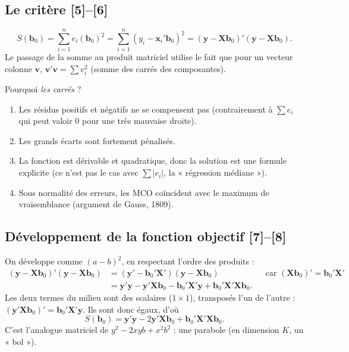 \documentclass[11pt,a4paper]{article}
\newcommand{\vy}{\mathbf{y}}
\newcommand{\vX}{\mathbf{X}}
\newcommand{\vb}{\mathbf{b}}
\newcommand{\vx}{\mathbf{x}}
\newcommand{\XtX}{\vX'\vX}
\newcommand{\sumi}{\sum_{i=1}^{n}}
\begin{document}
\subsection{Le critère [5]--[6]}
\[
S(\vb_0)=\sumi e_i(\vb_0)^2=\sumi (y_i-\vx_i'\vb_0)^2=(\vy-\vX\vb_0)'(\vy-\vX\vb_0).
\]
Le passage de la somme au produit matriciel utilise le fait que pour un vecteur colonne $\mathbf{v}$, $\mathbf v'\mathbf v=\sum v_i^2$ (somme des carrés des composantes).

\begin{intuition}
Pourquoi \emph{les carrés} ?
\begin{enumerate}[nosep]
\item Les résidus positifs et négatifs ne se compensent pas (contrairement à $\sum e_i$ qui peut valoir 0 pour une très mauvaise droite).
\item Les grands écarts sont fortement pénalisés.
\item La fonction est dérivable et quadratique, donc la solution est une formule explicite (ce n'est pas le cas avec $\sum|e_i|$, la « régression médiane »).
\item Sous normalité des erreurs, les MCO coïncident avec le maximum de vraisemblance (argument de Gauss, 1809).
\end{enumerate}
\end{intuition}

\subsection{Développement de la fonction objectif [7]--[8]}
\begin{detail}
On développe comme $(a-b)^2$, en respectant l'ordre des produits :
\begin{align*}
(\vy-\vX\vb_0)'(\vy-\vX\vb_0)&=(\vy'-\vb_0'\vX')(\vy-\vX\vb_0) &&\text{car }(\vX\vb_0)'=\vb_0'\vX'\\
&=\vy'\vy-\vy'\vX\vb_0-\vb_0'\vX'\vy+\vb_0'\vX'\vX\vb_0 .
\end{align*}
Les deux termes du milieu sont des scalaires ($1\times1$), transposés l'un de l'autre : $(\vy'\vX\vb_0)'=\vb_0'\vX'\vy$. Ils sont donc égaux, d'où
\[
S(\vb_0)=\vy'\vy-2\vy'\vX\vb_0+\vb_0'\XtX\vb_0 .
\]
C'est l'analogue matriciel de $y^2-2xyb+x^2b^2$ : une parabole (en dimension $K$, un « bol »).
\end{detail}
\end{document}
